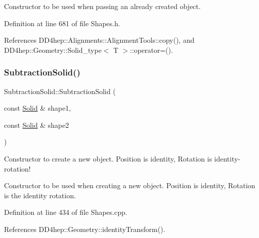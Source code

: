 Constructor to be used when passing an already created object. 



Definition at line 681 of file Shapes.\+h.



References D\+D4hep\+::\+Alignments\+::\+Alignment\+Tools\+::copy(), and D\+D4hep\+::\+Geometry\+::\+Solid\+\_\+type$<$ T $>$\+::operator=().

\hypertarget{class_d_d4hep_1_1_geometry_1_1_subtraction_solid_a41ea60f70c3ad3d119510470610936ec}{}\label{class_d_d4hep_1_1_geometry_1_1_subtraction_solid_a41ea60f70c3ad3d119510470610936ec} 
\subsubsection{\texorpdfstring{Subtraction\+Solid()}{SubtractionSolid()}\hspace{0.1cm}{\footnotesize\ttfamily [4/8]}}
{\footnotesize\ttfamily Subtraction\+Solid\+::\+Subtraction\+Solid (\begin{DoxyParamCaption}\item[{const \hyperlink{namespace_d_d4hep_1_1_geometry_a83de90a8dcc7378ba47d54ef9a6a687b}{Solid} \&}]{shape1,  }\item[{const \hyperlink{namespace_d_d4hep_1_1_geometry_a83de90a8dcc7378ba47d54ef9a6a687b}{Solid} \&}]{shape2 }\end{DoxyParamCaption})}



Constructor to create a new object. Position is identity, Rotation is identity-\/rotation! 

Constructor to be used when creating a new object. Position is identity, Rotation is the identity rotation. 

Definition at line 434 of file Shapes.\+cpp.



References D\+D4hep\+::\+Geometry\+::identity\+Transform().

\hypertarget{class_d_d4hep_1_1_geometry_1_1_subtraction_solid_a7db81162af38bc569247d94d06d7b3fd}{}\label{class_d_d4hep_1_1_geometry_1_1_subtraction_solid_a7db81162af38bc569247d94d06d7b3fd} 
